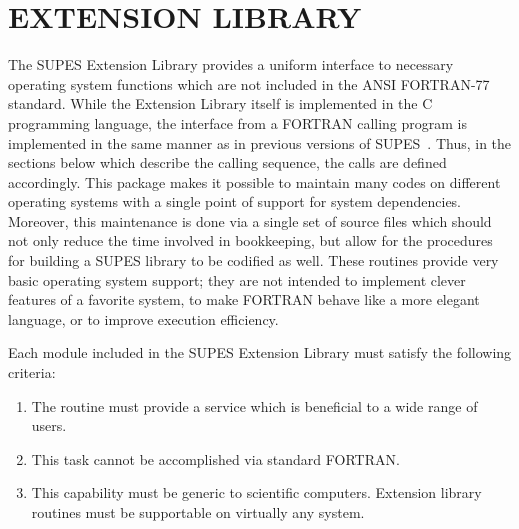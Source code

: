 \chapter{EXTENSION LIBRARY} \label{sec:extlib}
The SUPES Extension Library provides a uniform interface to
necessary operating system functions which are not included in the ANSI
FORTRAN-77 standard.
While the Extension Library itself is implemented in the C programming language,
the interface from a FORTRAN calling program is implemented in
the same manner as in previous versions of SUPES~\cite{SUPES}.
Thus, in the sections below which describe the calling sequence,
the calls are defined accordingly.
This package makes it possible to maintain many codes on
different operating systems with a single point of support for system
dependencies.
Moreover,
this maintenance is done via a single set of source files which
should not only reduce the time involved in bookkeeping,
but allow for the procedures for building a SUPES library to be codified
as well.
These routines provide very basic operating system support;
they are not intended to implement clever features of a favorite system, to
make FORTRAN behave like a more elegant language, or to improve execution
efficiency.

Each module included in the SUPES Extension Library must satisfy the
following criteria:
\begin{enumerate}
\item The routine must provide a service which is beneficial to a wide
range of users.

\item This task cannot be accomplished via standard FORTRAN.

\item This capability must be generic to scientific computers.  Extension
library routines must be supportable on virtually any system.
\end{enumerate}

